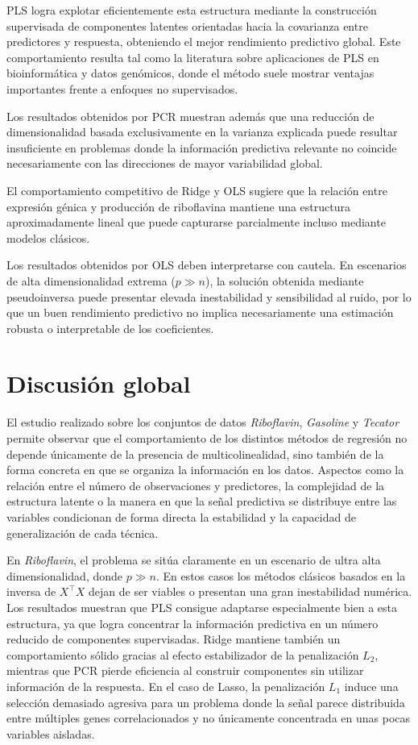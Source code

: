 \documentclass[12pt,a4paper]{report}
\begin{document}
PLS logra explotar eficientemente esta estructura mediante la construcción supervisada de componentes latentes orientadas hacia la covarianza entre predictores y respuesta, obteniendo el mejor rendimiento predictivo global. Este comportamiento resulta tal como la literatura sobre aplicaciones de PLS en bioinformática y datos genómicos, donde el método suele mostrar ventajas importantes frente a enfoques no supervisados.

Los resultados obtenidos por PCR muestran además que una reducción de dimensionalidad basada exclusivamente en la varianza explicada puede resultar insuficiente en problemas donde la información predictiva relevante no coincide necesariamente con las direcciones de mayor variabilidad global.

El comportamiento competitivo de Ridge y OLS sugiere que la relación entre expresión génica y producción de riboflavina mantiene una estructura aproximadamente lineal que puede capturarse parcialmente incluso mediante modelos clásicos. 

Los resultados obtenidos por OLS deben interpretarse con cautela. En escenarios de alta dimensionalidad extrema (\(p \gg n\)), la solución obtenida mediante pseudoinversa puede presentar elevada inestabilidad y sensibilidad al ruido, por lo que un buen rendimiento predictivo no implica necesariamente una estimación robusta o interpretable de los coeficientes.

\section{Discusión global}

El estudio realizado sobre los conjuntos de datos \textit{Riboflavin}, \textit{Gasoline} y \textit{Tecator} permite observar que el comportamiento de los distintos métodos de regresión no depende únicamente de la presencia de multicolinealidad, sino también de la forma concreta en que se organiza la información en los datos. Aspectos como la relación entre el número de observaciones y predictores, la complejidad de la estructura latente o la manera en que la señal predictiva se distribuye entre las variables condicionan de forma directa la estabilidad y la capacidad de generalización de cada técnica.

En \textit{Riboflavin}, el problema se sitúa claramente en un escenario de ultra alta dimensionalidad, donde \(p \gg n\). En estos casos los métodos clásicos basados en la inversa de \(X^\top X\) dejan de ser viables o presentan una gran inestabilidad numérica. Los resultados muestran que PLS consigue adaptarse especialmente bien a esta estructura, ya que logra concentrar la información predictiva en un número reducido de componentes supervisadas. Ridge mantiene también un comportamiento sólido gracias al efecto estabilizador de la penalización \(L_2\), mientras que PCR pierde eficiencia al construir componentes sin utilizar información de la respuesta. En el caso de Lasso, la penalización \(L_1\) induce una selección demasiado agresiva para un problema donde la señal parece distribuida entre múltiples genes correlacionados y no únicamente concentrada en unas pocas variables aisladas.
\end{document}
